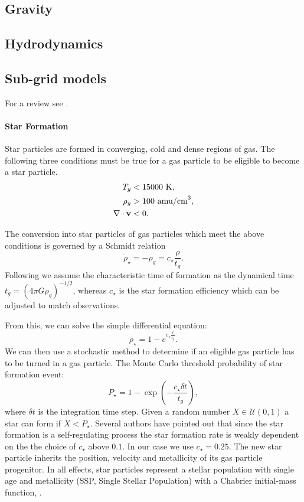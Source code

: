 \subsection{Gravity}

\subsection{Hydrodynamics}
\subsection{Sub-grid models}
For a review see \citet{Verbeke2017, Vandenbroucke2016}.

\paragraph{Star Formation}
Star particles are formed in converging, cold and dense regions of gas.
The following three conditions must be true for a gas particle to be eligible to become a star particle.
\begin{align*}
 T_g &< 15000 \text{~K},\\
 \rho_g &> 100 \text{~amu/cm}^{3},\\
 \nabla \cdot \boldsymbol{\mathbf{v}} & < 0.
\end{align*}

The conversion into star particles of gas particles which meet the above conditions is governed by a Schmidt relation \citep{Schmidt1959}
\begin{equation}                                                                              
\dot{\rho}_\star = -\dot{\rho}_g = c_\star \frac{\rho}{t_g}.
\label{eq:schmidt_relation}
\end{equation}
Following \citep{Stinson2006} we assume the characteristic time of formation as the dynamical time $t_g = (4 \pi G \rho_g)^{-1/2}$, whereas $c_\star$ is the star formation efficiency which can be adjusted to match observations.

From this, we can solve the simple differential equation: 
\begin{equation}
\rho_\star = 1 - e^{c_\star \frac{t}{t_g}}.
\end{equation}
We can then use a stochastic method to determine if an eligible gas particle has to be turned in a gas particle.
The Monte Carlo threshold probability of star formation event:
\begin{equation}
P_\star = 1-\exp(-\frac{c_\star \delta t}{t_g}),
\end{equation}
where $\delta t$ is the integration time step.
Given a random number $X \in \mathcal{U}(0,1)$ a star can form if $X < P_\star$.
Several authors \citep{Stinson2006, Revaz2009, Cloet-Osselaer2012} have pointed out that since the star formation is a self-regulating process the star formation rate is weakly dependent on the the choice of $c_\star$ above $0.1$. In our case we use $c_\star = 0.25$.
The new star particle inherits the position, velocity and metallicity of its gas particle progenitor.
In all effects, star particles represent a stellar population with single age and metallicity (SSP, Single Stellar Population) with a Chabrier initial-mass function, \citet{Chabrier2003}.

